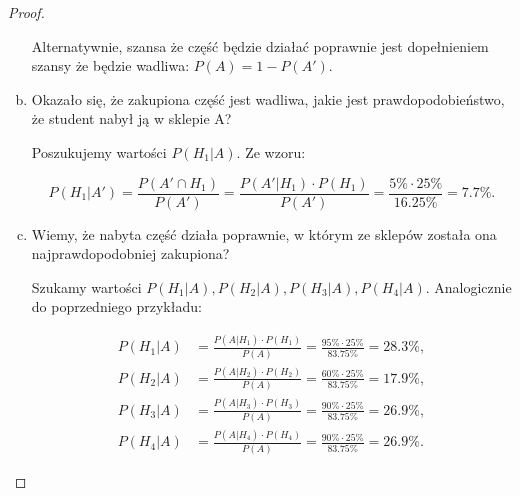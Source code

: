 \documentclass[11pt]{article}
\theoremstyle{definition}
\numberwithin{zadanie}{section}
\begin{document}
\begin{proof}
\begin{enumerate}[a)]
              Alternatywnie, szansa że część będzie działać poprawnie jest dopełnieniem szansy że będzie wadliwa: $P(A) = 1 - P(A')$.

        \item Okazało się, że zakupiona część jest wadliwa, jakie jest prawdopodobieństwo, że student nabył ją w sklepie A?

              Poszukujemy wartości $P(H_1|A)$. Ze wzoru:

              $$P(H_1|A') = \frac{P(A'\cap H_1)}{P(A')} = \frac{P(A'|H_1)\cdot P(H_1)}{P(A')} = \frac{5\%\cdot 25\%}{16.25\%} = 7.7\%.$$

        \item Wiemy, że nabyta część działa poprawnie, w którym ze sklepów została ona najprawdopodobniej zakupiona?

              Szukamy wartości $P(H_1|A), P(H_2|A), P(H_3|A), P(H_4|A)$. Analogicznie do poprzedniego przykładu:

              \begin{align*}
                  P(H_1|A) & = \frac{P(A|H_1)\cdot P(H_1)}{P(A)} = \frac{95\%\cdot 25\%}{83.75\%} = 28.3\%, \\
                  P(H_2|A) & = \frac{P(A|H_2)\cdot P(H_2)}{P(A)} = \frac{60\%\cdot 25\%}{83.75\%} = 17.9\%, \\
                  P(H_3|A) & = \frac{P(A|H_3)\cdot P(H_3)}{P(A)} = \frac{90\%\cdot 25\%}{83.75\%} = 26.9\%, \\
                  P(H_4|A) & = \frac{P(A|H_4)\cdot P(H_4)}{P(A)} = \frac{90\%\cdot 25\%}{83.75\%} = 26.9\%.
              \end{align*}

    \end{enumerate}

\end{proof}
\end{document}
